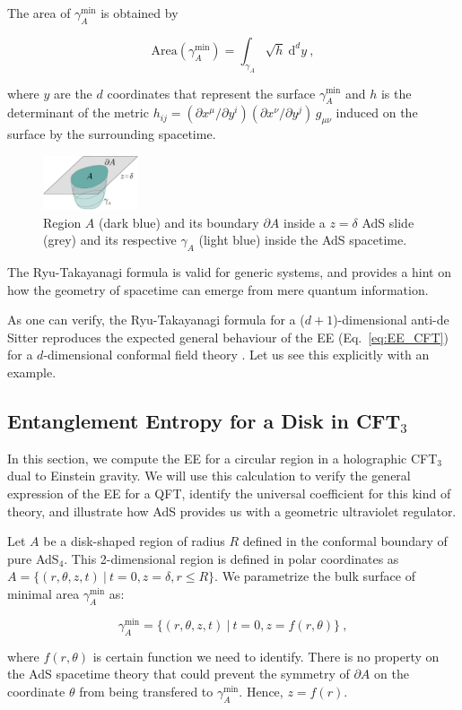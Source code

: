 \documentclass[twocolumn]{revtex4}
\providecommand{\eq}[2]{
    \begin{equation}
        #2
    \label{eq:#1}
    \end{equation}
}
\begin{document}
The area of $\gamma_A^\text{min}$ is obtained by
\eq{EE_RT-area}{
    \text{Area}(\gamma_A^\text{min}) = \int_{\gamma_A} \sqrt{h} \ \mathrm{d}^{d}y \ ,
}
where $y$ are the $d$ coordinates that represent the surface $\gamma_A^\text{min}$ and $h$ is the determinant of the metric $h_{ij} = (\partial x^\mu / \partial y^i) (\partial x^\nu / \partial y^j) \, g_{\mu\nu}$ induced on the surface by the surrounding spacetime.

\begin{figure}
    \centering
    \includegraphics[width=0.25\textwidth]{../imatges/EE_AdS-CFT-D.png}
\caption{Region $A$ (dark blue) and its boundary $\partial A$ inside a $z=\delta$ AdS slide (grey) and its respective $\gamma_A$ (light blue) inside the AdS spacetime.}
\label{fig:EE_AdS-CFT}
\end{figure}

The Ryu-Takayanagi formula is valid for generic systems, and provides a hint on how the geometry of spacetime can emerge from mere quantum information.

As one can verify, the Ryu-Takayanagi formula for a ($d+1$)-dimensional anti-de Sitter reproduces the expected general behaviour of the EE (Eq.~\ref{eq:EE_CFT}) for a $d$-dimensional conformal field theory \cite{ryu_aspects_2006, nishioka_holographic_2009}. Let us see this explicitly with an example.


\subsection{Entanglement Entropy for a Disk in CFT\texorpdfstring{$_3$}{3}} \label{ss:EE-disk}

In this section, we compute the EE for a circular region in a holographic CFT$_3$ dual to Einstein gravity. We will use this calculation to verify the general expression of the EE for a QFT, identify the universal coefficient for this kind of theory, and illustrate how AdS provides us with a geometric ultraviolet regulator.

Let $A$ be a disk-shaped region of radius $R$ defined in the conformal boundary of pure AdS$_4$. This 2-dimensional region is defined in polar coordinates as
$
    A = \{ ( r, \theta, z, t ) \ | \ t = 0, z = \delta, r \le R \} 
$. 
We parametrize the bulk surface of minimal area $\gamma_A^\text{min}$ as:
\eq{1gA}{
    \gamma_A^\text{min} = \{ ( r, \theta, z, t ) \ | \ t = 0, z = f (r, \theta) \} \ , \nonumber
}
where $f(r,\theta)$ is certain function we need to identify. There is no property on the AdS spacetime theory that could prevent the symmetry of $\partial A$ on the coordinate $\theta$ from being transfered to $\gamma_A^\text{min}$. Hence, $z=f(r)$.
\end{document}
